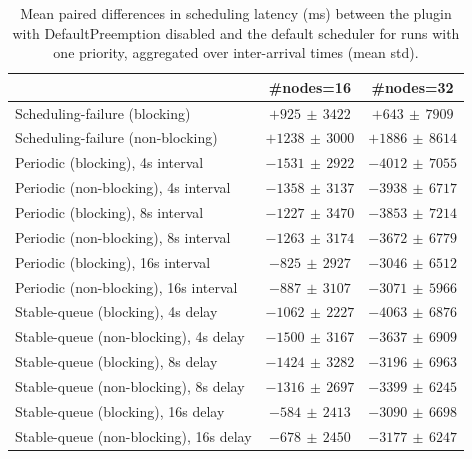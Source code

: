 \begin{table}[t]
\tiny
\setlength{\tabcolsep}{1.2pt}
\renewcommand{\arraystretch}{1.12}
\centering
\caption{Mean paired differences in scheduling latency (ms) between the plugin with DefaultPreemption disabled and the default scheduler for runs with one priority, aggregated over inter-arrival times (mean \pm std).}
\label{tab:latency-defpreempt0-prio1-std1-agg-arrival}
\begin{tabular}{l c c}
\toprule
 & \#nodes=16 & \#nodes=32 \\
\midrule
Scheduling-failure (blocking) & $+925\,\pm\,3422$ & $+643\,\pm\,7909$ \\
Scheduling-failure (non-blocking) & $+1238\,\pm\,3000$ & $+1886\,\pm\,8614$ \\
Periodic (blocking), 4s interval & $-1531\,\pm\,2922$ & $-4012\,\pm\,7055$ \\
Periodic (non-blocking), 4s interval & $-1358\,\pm\,3137$ & $-3938\,\pm\,6717$ \\
Periodic (blocking), 8s interval & $-1227\,\pm\,3470$ & $-3853\,\pm\,7214$ \\
Periodic (non-blocking), 8s interval & $-1263\,\pm\,3174$ & $-3672\,\pm\,6779$ \\
Periodic (blocking), 16s interval & $-825\,\pm\,2927$ & $-3046\,\pm\,6512$ \\
Periodic (non-blocking), 16s interval & $-887\,\pm\,3107$ & $-3071\,\pm\,5966$ \\
Stable-queue (blocking), 4s delay & $-1062\,\pm\,2227$ & $-4063\,\pm\,6876$ \\
Stable-queue (non-blocking), 4s delay & $-1500\,\pm\,3167$ & $-3637\,\pm\,6909$ \\
Stable-queue (blocking), 8s delay & $-1424\,\pm\,3282$ & $-3196\,\pm\,6963$ \\
Stable-queue (non-blocking), 8s delay & $-1316\,\pm\,2697$ & $-3399\,\pm\,6245$ \\
Stable-queue (blocking), 16s delay & $-584\,\pm\,2413$ & $-3090\,\pm\,6698$ \\
Stable-queue (non-blocking), 16s delay & $-678\,\pm\,2450$ & $-3177\,\pm\,6247$ \\
\bottomrule
\end{tabular}
\end{table}
